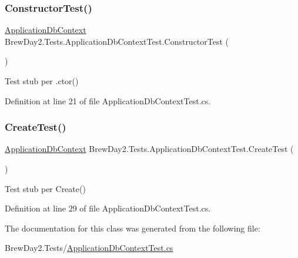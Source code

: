 \subsubsection{\texorpdfstring{Constructor\+Test()}{ConstructorTest()}}
{\footnotesize\ttfamily \mbox{\hyperlink{class_brew_day2_1_1_models_1_1_application_db_context}{Application\+Db\+Context}} Brew\+Day2.\+Tests.\+Application\+Db\+Context\+Test.\+Constructor\+Test (\begin{DoxyParamCaption}{ }\end{DoxyParamCaption})}



Test stub per .ctor()



Definition at line 21 of file Application\+Db\+Context\+Test.\+cs.

\mbox{\label{class_brew_day2_1_1_tests_1_1_application_db_context_test_a926392fbe74512d4f613edcd4f18b4fa}} 
\subsubsection{\texorpdfstring{Create\+Test()}{CreateTest()}}
{\footnotesize\ttfamily \mbox{\hyperlink{class_brew_day2_1_1_models_1_1_application_db_context}{Application\+Db\+Context}} Brew\+Day2.\+Tests.\+Application\+Db\+Context\+Test.\+Create\+Test (\begin{DoxyParamCaption}{ }\end{DoxyParamCaption})}



Test stub per Create()



Definition at line 29 of file Application\+Db\+Context\+Test.\+cs.



The documentation for this class was generated from the following file\+:\begin{DoxyCompactItemize}
\item 
Brew\+Day2.\+Tests/\mbox{\hyperlink{_application_db_context_test_8cs}{Application\+Db\+Context\+Test.\+cs}}\end{DoxyCompactItemize}
